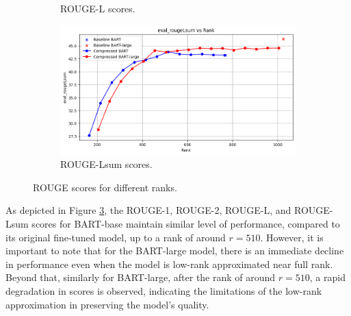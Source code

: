 \begin{figure}[H]
\begin{subfigure}[b]{0.45\textwidth}
        \caption{ROUGE-L scores.}
        \label{fig:sub3}
    \end{subfigure}
    \hfill
    \begin{subfigure}[b]{0.45\textwidth}
        \centering
        \includegraphics[width=\textwidth]{figs/06:05/RougeLSum.png}
        \caption{ROUGE-Lsum scores.}
        \label{fig:sub4}
    \end{subfigure}
    \caption{ROUGE scores for different ranks.}
    \label{fig:main}
\end{figure}

As depicted in Figure \ref{fig:main}, the ROUGE-1, ROUGE-2, ROUGE-L, and ROUGE-Lsum scores for BART-base maintain similar level of performance, compared to its original fine-tuned model, up to a rank of around \(r = 510\). However, it is important to note that for the BART-large model, there is an immediate decline in performance even when the model is low-rank approximated near full rank. Beyond that, similarly for BART-large, after the rank of around \(r = 510\), a rapid degradation in scores is observed, indicating the limitations of the low-rank approximation in preserving the model's quality.

